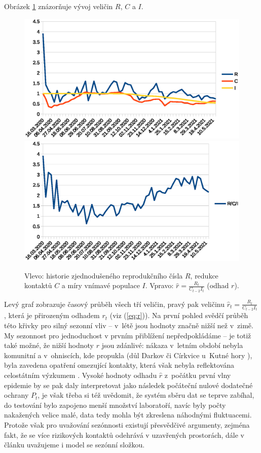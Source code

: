 Obrázek \ref{fig:rci} znázorňuje vývoj veličin $R$, $C$ a $I$.
\begin{figure}
\begin{center}
\includegraphics[scale=0.4]{pic/rc}\includegraphics[scale=0.4]{pic/rci}
\caption{Vlevo: historie zjednodušeného reprodukčního čísla $R$, redukce kontaktů $C$ a míry vnímavé populace $I$. Vpravo: $\hat{r} = \frac{R_{t}}{C_{t-2}I_t}$ (odhad $r$).} 
\label{fig:rci}
\end{center}
\end{figure}
Levý graf zobrazuje časový průběh všech tří veličin, pravý pak veličinu
$\hat{r}_t = \frac{R_{t}}{C_{t-2}I_{t}}$, která je přirozeným odhadem $r_{t}$
(viz (\ref{eq:r})). Na první pohled svědčí průběh této 
křivky pro silný sezonní vliv -- v~létě jsou hodnoty značně
nižší než v~zimě. My sezonnost pro jednoduchost v prvním přiblížení nepředpokládáme -- je totiž také možné, že nižší hodnoty
$r$ jsou zdánlivé: nákaza v~letním období nebyla komunitní a v~ohniscích,
kde propukla (důl Darkov \cite{darkov} či Církvice u~Kutné hory \cite{cirkvice}),
byla zavedena opatření omezující kontakty, která však nebyla reflektována
celostátním výzkumem \cite{paqcovid}.
Vysoké hodnoty odhadu $\hat r$ z~počátku první vlny
epidemie by se pak daly interpretovat jako následek počáteční nulové dodatečné
ochrany $P_{t}$, je však třeba si též uvědomit, že systém sběru
dat se teprve zabíhal, do testování bylo zapojeno menší množství laboratoří, navíc byly počty nakažených velice malé, data
tedy mohla být zkreslena náhodnými fluktuacemi. Protože však pro uvažování sezónnosti existují přesvědčivé argumenty, zejména fakt, že se více rizikových kontaktů odehrává v uzavřených prostorách, dále v článku uvažujeme i model se sezónní složkou.


